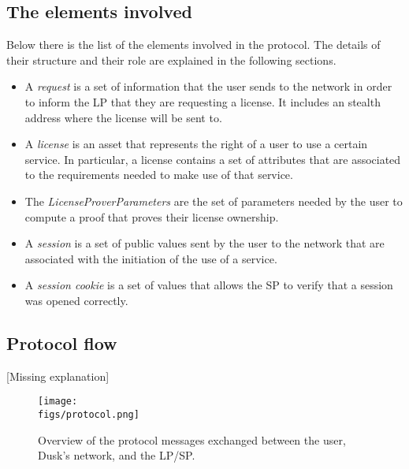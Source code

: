 \subsection{The elements involved}

Below there is the list of the elements involved in the protocol. The details of their structure and their role are explained in the following sections. 

\begin{itemize}
	\item A \emph{request} is a set of information that the user sends to the network in order to inform the LP that they are requesting a license. It includes an stealth address where the license will be sent to.
	\item A \emph{license} is an asset that represents the right of a user to use a certain service. In particular, a license contains a set of attributes that are associated to the requirements needed to make use of that service.
	\item The \emph{LicenseProverParameters} are the set of parameters needed by the user to compute a proof that proves their license ownership.
	\item A \emph{session} is a set of public values sent by the user to the network that are associated with the initiation of the use of a service.
	\item A \emph{session cookie} is a set of values that allows the SP to verify that a session was opened correctly.
\end{itemize}

\subsection{Protocol flow}

{\color{red}[Missing explanation]}

\begin{figure}[h]
	\centering
	\texttt{[image: \\figs/protocol.png]}
	\caption{Overview of the protocol messages exchanged between the user, Dusk's network, and the LP/SP.}
	\label{fig:protocol}
\end{figure}

